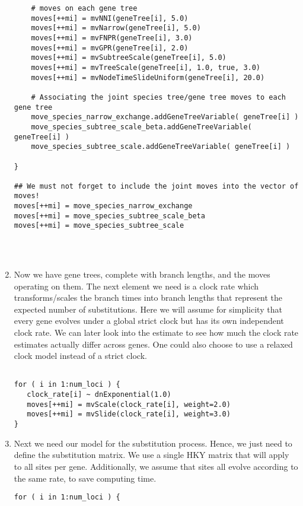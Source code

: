 \begin{enumerate}
{\begin{snugshade*}
\begin{lstlisting}
    # moves on each gene tree
    moves[++mi] = mvNNI(geneTree[i], 5.0)
    moves[++mi] = mvNarrow(geneTree[i], 5.0)
    moves[++mi] = mvFNPR(geneTree[i], 3.0)
    moves[++mi] = mvGPR(geneTree[i], 2.0)
    moves[++mi] = mvSubtreeScale(geneTree[i], 5.0)
    moves[++mi] = mvTreeScale(geneTree[i], 1.0, true, 3.0)
    moves[++mi] = mvNodeTimeSlideUniform(geneTree[i], 20.0)

    # Associating the joint species tree/gene tree moves to each gene tree
    move_species_narrow_exchange.addGeneTreeVariable( geneTree[i] )
    move_species_subtree_scale_beta.addGeneTreeVariable( geneTree[i] )
    move_species_subtree_scale.addGeneTreeVariable( geneTree[i] )

}

## We must not forget to include the joint moves into the vector of moves!
moves[++mi] = move_species_narrow_exchange
moves[++mi] = move_species_subtree_scale_beta
moves[++mi] = move_species_subtree_scale




\end{lstlisting}
\end{snugshade*}}


\item Now we have gene trees, complete with branch lengths, and the moves operating on them. 
The next element we need is a clock rate which transforms/scales the branch times into branch lengths that represent the expected number of substitutions.
Here we will assume for simplicity that every gene evolves under a global strict clock but has its own independent clock rate.
We can later look into the estimate to see how much the clock rate estimates actually differ across genes.
One could also choose to use a relaxed clock model instead of a strict clock.

{\tt \begin{snugshade*}
\begin{lstlisting}

for ( i in 1:num_loci ) {
   clock_rate[i] ~ dnExponential(1.0)
   moves[++mi] = mvScale(clock_rate[i], weight=2.0)
   moves[++mi] = mvSlide(clock_rate[i], weight=3.0)
}
\end{lstlisting}
\end{snugshade*}}

\item Next we need our model for the substitution process. 
Hence, we just need to define the substitution matrix. 
We use a single HKY matrix that will apply to all sites per gene.
Additionally, we assume that sites all evolve according to the same rate, to save computing time.
{\tt \begin{snugshade*}
\begin{lstlisting}
for ( i in 1:num_loci ) {


\end{lstlisting}
\end{snugshade*}}
\end{enumerate}
